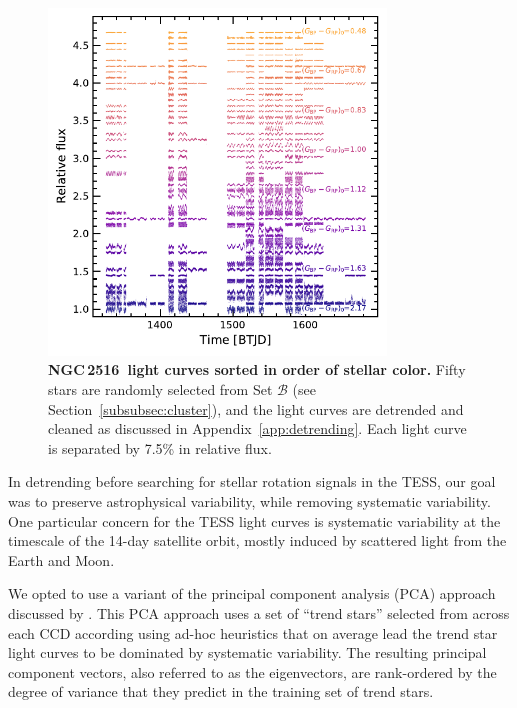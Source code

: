 \documentclass[12pt,twocolumn,tighten]{aastex63}
\newcommand{\cn}{NGC\,2516} %
\begin{document}
\begin{figure}[b]
	\begin{center}
		\leavevmode
		\includegraphics[width=0.8\textwidth]{f14.pdf}
	\end{center}
	\vspace{-1cm}
  \caption{ {\bf \cn\ light curves sorted in order
  of stellar color.} Fifty stars are randomly selected from Set
  $\mathcal{B}$ (see Section~\ref{subsubsec:cluster}), and the light
  curves are detrended and cleaned as discussed in
  Appendix~\ref{app:detrending}.  Each light curve is separated by
  7.5\% in relative flux.  \label{fig:lightcurves}
	}
\end{figure}



In detrending before searching for stellar rotation signals in the
TESS, our goal was to preserve astrophysical variability, while
removing systematic variability.  One particular concern for the TESS
light curves is systematic variability at the timescale of the 14-day
satellite orbit, mostly induced by scattered light from the Earth and
Moon.

We opted to use a variant of the principal component analysis (PCA)
approach discussed by \citet{bouma_cdipsI_2019}. This PCA approach
uses a set of ``trend stars'' selected from across each CCD according
using ad-hoc heuristics that on average lead the trend star light
curves to be dominated by systematic variability.  The resulting
principal component vectors, also referred to as the eigenvectors, are
rank-ordered by the degree of variance that they predict in the
training set of trend stars.
\end{document}
